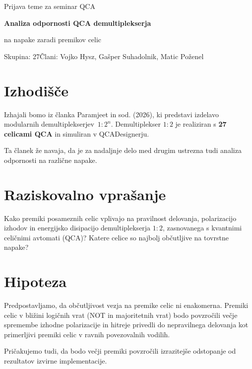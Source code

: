\documentclass[10pt,a4paper]{article}
\begin{document}
\begin{center}
    {\fontsize{11}{13}\selectfont Prijava teme za seminar QCA}\par
    \vspace{5pt}
    {\bfseries\fontsize{16}{19}\selectfont Analiza odpornosti QCA demultiplekserja\par na napake zaradi premikov celic}\par
    \vspace{6pt}
    {\small Skupina: 27\qquad Člani: Vojko Hysz, Gašper Suhadolnik, Matic Poženel}
\end{center}

\vspace{-5pt}
\section*{Izhodišče}
Izhajali bomo iz članka Paramjeet in sod. (2026), ki predstavi izdelavo modularnih demultiplekserjev~$1:2^n$. Demultiplekser $1:2$ je realiziran s \textbf{27 celicami QCA} in simuliran v QCADesignerju.

Ta članek že navaja, da je za nadaljnje delo med drugim ustrezna tudi analiza odpornosti na različne napake.

\section*{Raziskovalno vprašanje}
Kako premiki posameznih celic vplivajo na pravilnost delovanja, polarizacijo izhodov in energijsko disipacijo demultiplekserja $1:2$, zasnovanega s kvantnimi celičnimi avtomati (QCA)? Katere celice so najbolj občutljive na tovrstne napake?

\section*{Hipoteza}
Predpostavljamo, da občutljivost vezja na premike celic ni enakomerna. Premiki celic v bližini logičnih vrat (NOT in majoritetnih vrat) bodo povzročili večje spremembe izhodne polarizacije in hitreje privedli do nepravilnega delovanja kot primerljivi premiki celic v ravnih povezovalnih vodilih.

Pričakujemo tudi, da bodo večji premiki povzročili izrazitejše odstopanje od rezultatov izvirne implementacije.
\end{document}
